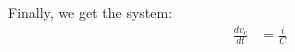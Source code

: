\documentclass[preview]{standalone}
\begin{document}
\begin{center}
Finally, we get the system: 
            \begin{align*}
                \frac{dv_c}{dt} &= \frac{i}{C} \\
            \end{align*}
\end{center}
\end{document}

